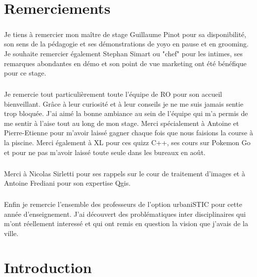 \documentclass[a4paper]{report}
\begin{document}
\chapter*{Remerciements}

\paragraph{} Je tiens à remercier mon maître de stage Guillaume Pinot pour sa disponibilité, son sens de la pédagogie et ses démonstrations de yoyo en pause et en grooming.  Je souhaite remercier également Stephan Simart ou "chef" pour les intimes, ses remarques abondantes en démo et son point de vue marketing ont été bénéfique pour ce stage.

\paragraph{} Je remercie tout particulièrement toute l'équipe de RO pour son accueil bienveillant. Grâce à leur curiosité et à leur conseils je ne me suis jamais sentie trop bloquée. J'ai aimé la bonne ambiance au sein de l'équipe qui m'a permis de me sentir à l'aise tout au long de mon stage. Merci spécialement à Antoine et Pierre-Etienne pour m'avoir laissé gagner chaque fois que nous faisions la course à la piscine. Merci également à XL pour ces quizz C++, ses cours sur Pokemon Go et pour ne pas m'avoir laissé toute seule dans les bureaux en août.

\paragraph{} Merci à Nicolas Sirletti pour ses rappels sur le cour de traitement d'images et à Antoine Frediani pour son expertise Qgis.

\paragraph{} Enfin je remercie l'ensemble des professeurs de l'option urbaniSTIC pour cette année d'enseignement. J'ai découvert des problématiques inter disciplinaires qui m'ont réellement interessé et qui ont remis en question la vision que j'avais de la ville.	

\newpage

\chapter*{Introduction}
	
\end{document}
